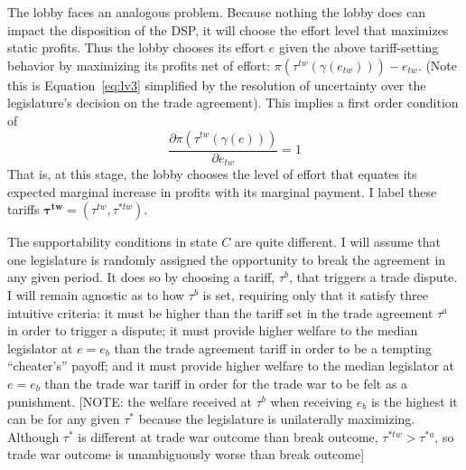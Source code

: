 \documentclass[authoryear, review]{elsarticle}
\newcommand{\ga}{\gamma}
\newcommand{\btw}{\bm{\tau^{tw}}}
\begin{document}
\noindent The lobby faces an analogous problem. Because nothing the lobby does can impact the disposition of the DSP, it will choose the effort level that maximizes static profits. Thus the lobby chooses its effort $e$ given the above tariff-setting behavior by maximizing its profits net of effort: $\pi\left(\tau^{tw}\left(\ga\left(e_{tw}\right)\right)\right) - e_{tw}$. (Note this is Equation~\ref{eq:lv3} simplified by the resolution of uncertainty over the legislature's decision on the trade agreement). This implies a first order condition of
\begin{equation}
	\frac{\partial \pi(\tau^{tw}(\ga(e)))}{\partial e_{tw}} = 1
  \label{eq:lobtw}
\end{equation}
That is, at this stage, the lobby chooses the level of effort that equates its expected marginal increase in profits with its marginal payment. I label these tariffs $\btw = (\tau^{tw},\tau^{*tw})$.

The supportability conditions in state $C$ are quite different. I will assume that one legislature is randomly assigned the opportunity to break the agreement in any given period. It does so by choosing a tariff, $\tau^b$, that triggers a trade dispute. I will remain agnostic as to how $\tau^b$ is set, requiring only that it satisfy three intuitive criteria: it must be higher than the tariff set in the trade agreement $\tau^a$ in order to trigger a dispute; it must provide higher welfare to the median legislator at $e=e_b$ than the trade agreement tariff in order to be a tempting ``cheater's'' payoff; and it must provide higher welfare to the median legislator at $e=e_b$ than the trade war tariff in order for the trade war to be felt as a punishment. [NOTE: the welfare received at $\tau^b$ when receiving $e_b$ is the highest it can be for any given $\tau^*$ because the legislature is unilaterally maximizing. Although $\tau^*$ is different at trade war outcome than break outcome, $\tau^{*tw} > \tau^{*a}$, so trade war outcome is unambiguously worse than break outcome] 
\end{document}
